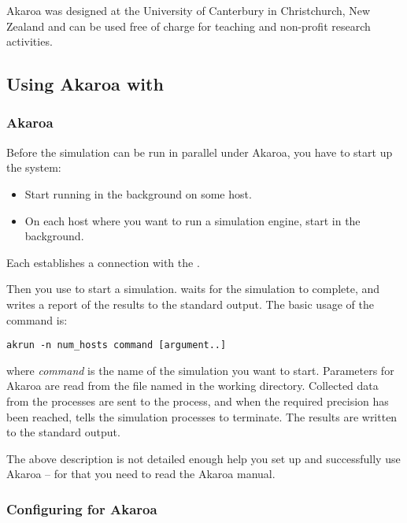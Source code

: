 Akaroa was designed at the University of Canterbury in Christchurch, New Zealand
and can be used free of charge for teaching and non-profit research activities.


\subsection{Using Akaroa with {\opp}}

\subsubsection{Akaroa}

Before the simulation can be run in parallel under Akaroa, you have to
start up the system:

\begin{itemize}
  \item{Start  running in the background on some host.}
  \item{On each host where you want to run a simulation engine,
     start  in the background.}
\end{itemize}

Each  establishes a connection with the .

Then you use  to start a simulation.  waits
for the simulation to complete, and writes a report of the results
to the standard output. The basic usage of the  command is:

\begin{verbatim}
akrun -n num_hosts command [argument..]
\end{verbatim}

where \textit{command} is the name of the simulation you want to start.
Parameters for Akaroa are read from the file named  in
the working directory. Collected data from the processes are
sent to the  process, and when the required precision
has been reached,  tells the simulation processes to
terminate. The results are written to the standard output.

The above description is not detailed enough help you
set up and successfully use Akaroa -- for that you need to read the
Akaroa manual.

\subsubsection{Configuring {\opp} for Akaroa}

